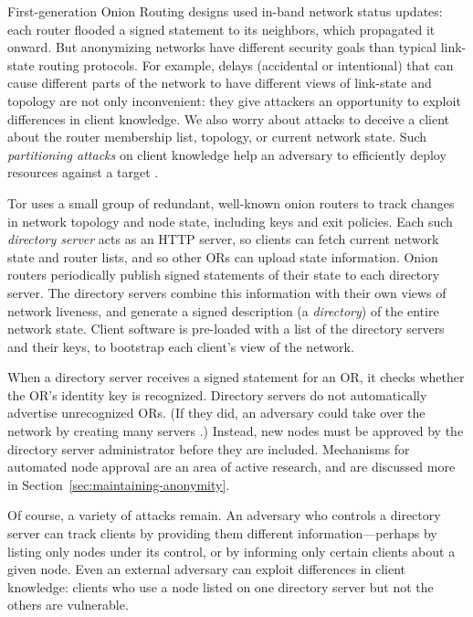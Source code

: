 \documentclass[times,10pt,twocolumn]{article}
\begin{document}
\label{subsec:dirservers}

First-generation Onion Routing designs \cite{freedom2-arch,or-jsac98} used
in-band network status updates: each router flooded a signed statement
to its neighbors, which propagated it onward. But anonymizing networks
have different security goals than typical link-state routing protocols.
For example, delays (accidental or intentional)
that can cause different parts of the network to have different views
of link-state and topology are not only inconvenient: they give
attackers an opportunity to exploit differences in client knowledge.
We also worry about attacks to deceive a
client about the router membership list, topology, or current network
state. Such \emph{partitioning attacks} on client knowledge help an
adversary to efficiently deploy resources
against a target \cite{minion-design}.

Tor uses a small group of redundant, well-known onion routers to
track changes in network topology and node state, including keys and
exit policies.  Each such \emph{directory server} acts as an HTTP
server, so clients can fetch current network state
and router lists, and so other ORs can upload
state information.  Onion routers periodically publish signed
statements of their state to each directory server. The directory servers
combine this information with their own views of network liveness,
and generate a signed description (a \emph{directory}) of the entire
network state. Client software is
pre-loaded with a list of the directory servers and their keys,
to bootstrap each client's view of the network.

When a directory server receives a signed statement for an OR, it
checks whether the OR's identity key is recognized. Directory
servers do not automatically advertise unrecognized ORs. (If they did,
an adversary could take over the network by creating many servers
\cite{sybil}.) Instead, new nodes must be approved by the directory
server administrator before they are included. Mechanisms for automated
node approval are an area of active research, and are discussed more
in Section~\ref{sec:maintaining-anonymity}.

Of course, a variety of attacks remain. An adversary who controls
a directory server can track clients by providing them different
information---perhaps by listing only nodes under its control, or by
informing only certain clients about a given node. Even an external
adversary can exploit differences in client knowledge: clients who use
a node listed on one directory server but not the others are vulnerable.
\end{document}
